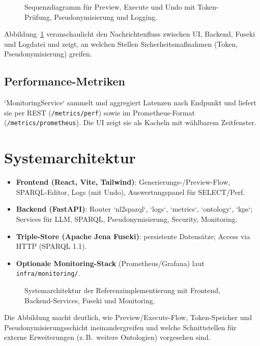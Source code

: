 \begin{figure}[ht]
  \centering
  
  \caption{Sequenzdiagramm für Preview, Execute und Undo mit Token-Prüfung, Pseudonymisierung und Logging.}
  \label{fig:logging-sequence}
\end{figure}

Abbildung~\ref{fig:logging-sequence} veranschaulicht den Nachrichtenfluss zwischen UI, Backend, Fuseki und Logdatei und zeigt, an welchen Stellen Sicherheitsmaßnahmen (Token, Pseudonymisierung) greifen.

\subsection{Performance-Metriken}
`MonitoringService` sammelt und aggregiert Latenzen nach Endpunkt und liefert sie per REST (\texttt{/metrics/perf}) sowie im Prometheus-Format (\texttt{/metrics/prometheus}). Die UI zeigt sie als Kacheln mit wählbarem Zeitfenster.

\section{Systemarchitektur}
\label{subsec:arch-backend}
\begin{itemize}
  \item \textbf{Frontend (React, Vite, Tailwind)}: Generierungs-/Preview-Flow, SPARQL-Editor, Logs (mit Undo), Auswertungspanel für SELECT/Perf.
  \item \textbf{Backend (FastAPI)}: Router `nl2sparql`, `logs`, `metrics`, `ontology`, `kps`; Services für LLM, SPARQL, Pseudonymisierung, Security, Monitoring.
  \item \textbf{Triple-Store (Apache Jena Fuseki)}: persistente Datensätze; Access via HTTP (SPARQL 1.1).
  \item \textbf{Optionale Monitoring-Stack} (Prometheus/Grafana) laut \texttt{infra/monitoring/}.
\end{itemize}

\begin{figure}[ht]
  \centering
  
  \caption{Systemarchitektur der Referenzimplementierung mit Frontend, Backend-Services, Fuseki und Monitoring.}
  \label{fig:architecture}
\end{figure}

Die Abbildung macht deutlich, wie Preview/Execute-Flow, Token-Speicher und Pseudonymisierungsschicht ineinandergreifen und welche Schnittstellen für externe Erweiterungen (z.\,B.\ weitere Ontologien) vorgesehen sind.

